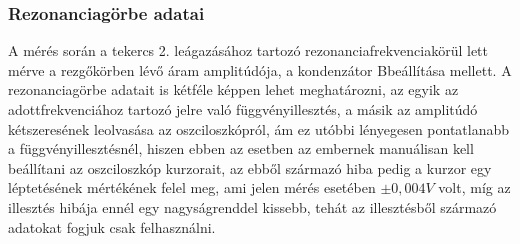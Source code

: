 \documentclass[10pt,pdftex]{report}
\begin{document}
\subsubsection{Rezonanciagörbe adatai}
A mérés során a tekercs 2. leágazásához tartozó rezonanciafrekvencia\footnotemark körül lett mérve a 
rezgőkörben lévő áram amplitúdója, a kondenzátor B\footnotemark beállítása mellett. 
\newline
A rezonanciagörbe adatait is kétféle képpen lehet meghatározni, az egyik az adottfrekvenciához tartozó jelre való függvényillesztés\footnotemark, a másik az amplitúdó
kétszeresének leolvasása az oszciloszkópról, ám ez utóbbi lényegesen pontatlanabb a függvényillesztésnél, hiszen ebben az esetben az embernek manuálisan kell beállítani 
az oszciloszkóp kurzorait, az ebből származó hiba pedig a kurzor egy léptetésének mértékének felel meg, ami jelen mérés esetében $\pm0,004V$ volt, míg az illesztés 
hibája ennél egy nagyságrenddel kissebb, tehát az illesztésből származó adatokat fogjuk csak felhasználni.\newline
\end{document}
